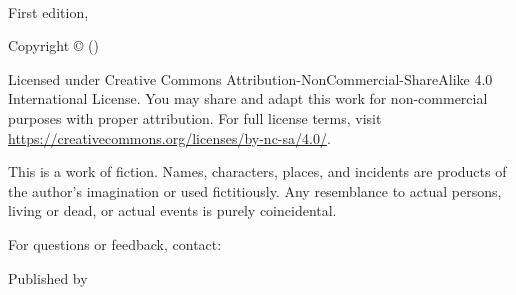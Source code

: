 {\small
\setlength{\parindent}{0em}\setlength{\parskip}{1em}
~
\vfill

First edition, \pubyear

Copyright \copyright{} \pubyear{} \authorfull{} (\authorname)

Licensed under Creative Commons Attribution-NonCommercial-ShareAlike 4.0 International License. 
You may share and adapt this work for non-commercial purposes with proper attribution. 
For full license terms, visit \url{https://creativecommons.org/licenses/by-nc-sa/4.0/}.

This is a work of fiction. Names, characters, places, and incidents are products of the author's imagination or used fictitiously. Any resemblance to actual persons, living or dead, or actual events is purely coincidental.

For questions or feedback, contact: \textbf{\contactemail}

Published by \publisher
}
